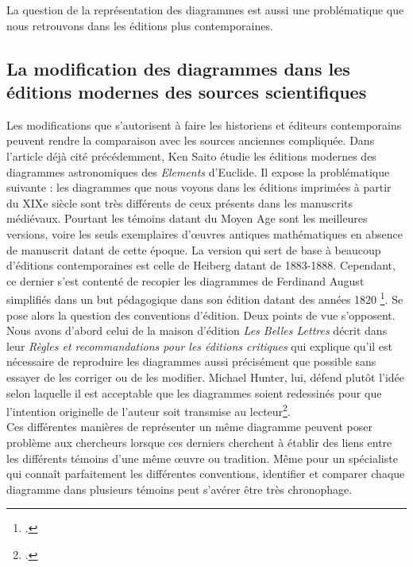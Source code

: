 La question de la représentation des diagrammes est aussi une problématique que nous retrouvons dans les éditions plus contemporaines. 

\subsection{La modification des diagrammes dans les éditions modernes des sources scientifiques}

Les modifications que s'autorisent à faire les historiens et éditeurs contemporains peuvent rendre la comparaison avec les sources anciennes compliquée. Dans l'article déjà cité précédemment, Ken Saito étudie les éditions modernes des diagrammes astronomiques des \textit{Elements} d'Euclide. Il expose la problématique suivante : les diagrammes que nous voyons dans les éditions imprimées à partir du XIXe siècle sont très différents de ceux présents dans les manuscrits médiévaux. Pourtant les témoins datant du Moyen Age sont les meilleures versions, voire les seuls exemplaires d'œuvres antiques mathématiques en absence de manuscrit datant de cette époque. La version qui sert de base à beaucoup d'éditions contemporaines est celle de Heiberg datant de 1883-1888. Cependant, ce dernier s'est contenté de recopier les diagrammes de Ferdinand August simplifiés dans un but pédagogique dans son édition datant des années 1820 \footcite{saitoTraditionsDiagramTradition2012}. Se pose alors la question des conventions d'édition. Deux points de vue s'opposent. Nous avons d'abord celui de la maison d'édition \textit{Les Belles Lettres} décrit dans leur \textit{Règles et recommandations pour les éditions critiques} qui explique qu'il est nécessaire de reproduire les diagrammes aussi précisément que possible sans essayer de les corriger ou de les modifier. Michael Hunter, lui, défend plutôt l'idée selon laquelle il est acceptable que les diagrammes soient redessinés pour que l'intention originelle de l'auteur soit transmise au lecteur\footcite{jardineCriticalEditingEarlyModern2010}.\\

Ces différentes manières de représenter un même diagramme peuvent poser problème aux chercheurs lorsque ces derniers cherchent à établir des liens entre les différents témoins d'une même œuvre ou tradition. Même pour un spécialiste qui connaît parfaitement les différentes conventions, identifier et comparer chaque diagramme dans plusieurs témoins peut s'avérer être très chronophage.